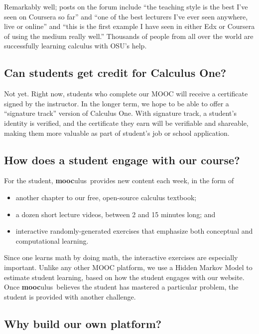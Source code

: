 \documentclass[12pt]{amsart}
\newcommand{\mooculus}{\textsf{\textbf{mooc}ulus}}
\begin{document}
Remarkably well; posts on the forum include ``the teaching style is
the best I've seen on Coursera so far'' and ``one of the best
lecturers I've ever seen anywhere, live or online'' and ``this is the
first example I have seen in either Edx or Coursera of using the
medium really well.''  Thousands of people from all over the world are
successfully learning calculus with OSU's help.

\subsection*{Can students get credit for Calculus One?}

Not yet.  Right now, students who complete our MOOC will receive a
certificate signed by the instructor.  In the longer term, we hope to
be able to offer a ``signature track'' version of Calculus One.  With
signature track, a student's identity is verified, and the certificate
they earn will be verifiable and shareable, making them more valuable
as part of student's job or school application.

\pagebreak

\subsection*{How does a student engage with our course?}

For the student, \mooculus\ provides new content each week, in the form of
\begin{itemize}
\item another chapter to our free, open-source calculus textbook;
\item a dozen short lecture videos, between 2 and 15 minutes long; and
\item interactive randomly-generated exercises that emphasize both conceptual and computational learning.
\end{itemize}
Since one learns math by doing math, the interactive exercises are
especially important.  Unlike any other MOOC platform, we use
a Hidden Markov Model to estimate student learning, based on how the
student engages with our website.  Once \mooculus\ believes the
student has mastered a particular problem, the
student is provided with another challenge.

\subsection*{Why build our own platform?}
\end{document}
